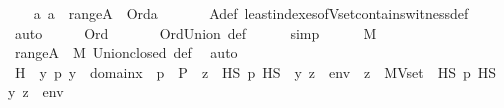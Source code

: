 \begin{isabellebody}
\isanewline
\ \ \isamarkupfalse%
\ {\isachardoublequoteopen}{\isasymAnd}a{\isachardot}{\kern0pt}\ a\ {\isasymin}\ range{\isacharparenleft}{\kern0pt}A{\isacharparenright}{\kern0pt}\ {\isasymLongrightarrow}\ Ord{\isacharparenleft}{\kern0pt}a{\isacharparenright}{\kern0pt}{\isachardoublequoteclose}\ \isanewline
\ \ \ \ \isamarkupfalse%
\ A{\isacharunderscore}{\kern0pt}def\ least{\isacharunderscore}{\kern0pt}indexes{\isacharunderscore}{\kern0pt}of{\isacharunderscore}{\kern0pt}Vset{\isacharunderscore}{\kern0pt}contains{\isacharunderscore}{\kern0pt}witness{\isacharunderscore}{\kern0pt}def\isanewline
\ \ \ \ \isamarkupfalse%
\ auto\isanewline
\isanewline
\ \ \isamarkupfalse%
\ \isamarkupfalse%
\ {\isachardoublequoteopen}Ord{\isacharparenleft}{\kern0pt}{\isasymalpha}{\isacharparenright}{\kern0pt}{\isachardoublequoteclose}\ \isanewline
\ \ \ \ \isamarkupfalse%
\ Ord{\isacharunderscore}{\kern0pt}Union\ {\isasymalpha}{\isacharunderscore}{\kern0pt}def\isanewline
\ \ \ \ \isamarkupfalse%
\ simp\isanewline
\isanewline
\ \ \isamarkupfalse%
\ {\isachardoublequoteopen}{\isasymalpha}\ {\isasymin}\ M{\isachardoublequoteclose}\ \isamarkupfalse%
\ {\isacartoucheopen}range{\isacharparenleft}{\kern0pt}A{\isacharparenright}{\kern0pt}\ {\isasymin}\ M{\isacartoucheclose}\ Union{\isacharunderscore}{\kern0pt}closed\ {\isasymalpha}{\isacharunderscore}{\kern0pt}def\ \isamarkupfalse%
\ auto\isanewline
\isanewline
\ \ \isamarkupfalse%
\ H\ {\isacharcolon}{\kern0pt}\ {\isachardoublequoteopen}{\isasymAnd}y\ p{\isachardot}{\kern0pt}\ y\ {\isasymin}\ domain{\isacharparenleft}{\kern0pt}x{\isacharparenright}{\kern0pt}\ {\isasymLongrightarrow}\ p\ {\isasymin}\ P\ {\isasymLongrightarrow}\ {\isacharparenleft}{\kern0pt}{\isasymexists}z\ {\isasymin}\ HS{\isachardot}{\kern0pt}\ p\ {\isasymtturnstile}HS\ {\isasymphi}\ {\isacharparenleft}{\kern0pt}{\isacharbrackleft}{\kern0pt}y{\isacharcomma}{\kern0pt}\ z{\isacharbrackright}{\kern0pt}\ {\isacharat}{\kern0pt}\ env{\isacharparenright}{\kern0pt}{\isacharparenright}{\kern0pt}\ {\isasymLongrightarrow}\ {\isacharparenleft}{\kern0pt}{\isasymexists}z\ {\isasymin}\ MVset{\isacharparenleft}{\kern0pt}{\isasymalpha}{\isacharparenright}{\kern0pt}\ {\isasyminter}\ HS{\isachardot}{\kern0pt}\ p\ {\isasymtturnstile}HS\ {\isasymphi}\ {\isacharparenleft}{\kern0pt}{\isacharbrackleft}{\kern0pt}y{\isacharcomma}{\kern0pt}\ z{\isacharbrackright}{\kern0pt}\ {\isacharat}{\kern0pt}\ env{\isacharparenright}{\kern0pt}{\isacharparenright}{\kern0pt}{\isachardoublequoteclose}\isanewline

\end{isabellebody}
